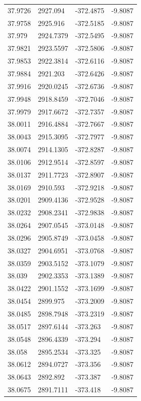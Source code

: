 \begin{table}[H]
\begin{tabular}{llll}
37.9726 & 2927.094 & -372.4875 & -9.8087 \\
37.9758 & 2925.916 & -372.5185 & -9.8087 \\
37.979 & 2924.7379 & -372.5495 & -9.8087 \\
37.9821 & 2923.5597 & -372.5806 & -9.8087 \\
37.9853 & 2922.3814 & -372.6116 & -9.8087 \\
37.9884 & 2921.203 & -372.6426 & -9.8087 \\
37.9916 & 2920.0245 & -372.6736 & -9.8087 \\
37.9948 & 2918.8459 & -372.7046 & -9.8087 \\
37.9979 & 2917.6672 & -372.7357 & -9.8087 \\
38.0011 & 2916.4884 & -372.7667 & -9.8087 \\
38.0043 & 2915.3095 & -372.7977 & -9.8087 \\
38.0074 & 2914.1305 & -372.8287 & -9.8087 \\
38.0106 & 2912.9514 & -372.8597 & -9.8087 \\
38.0137 & 2911.7723 & -372.8907 & -9.8087 \\
38.0169 & 2910.593 & -372.9218 & -9.8087 \\
38.0201 & 2909.4136 & -372.9528 & -9.8087 \\
38.0232 & 2908.2341 & -372.9838 & -9.8087 \\
38.0264 & 2907.0545 & -373.0148 & -9.8087 \\
38.0296 & 2905.8749 & -373.0458 & -9.8087 \\
38.0327 & 2904.6951 & -373.0768 & -9.8087 \\
38.0359 & 2903.5152 & -373.1079 & -9.8087 \\
38.039 & 2902.3353 & -373.1389 & -9.8087 \\
38.0422 & 2901.1552 & -373.1699 & -9.8087 \\
38.0454 & 2899.975 & -373.2009 & -9.8087 \\
38.0485 & 2898.7948 & -373.2319 & -9.8087 \\
38.0517 & 2897.6144 & -373.263 & -9.8087 \\
38.0548 & 2896.4339 & -373.294 & -9.8087 \\
38.058 & 2895.2534 & -373.325 & -9.8087 \\
38.0612 & 2894.0727 & -373.356 & -9.8087 \\
38.0643 & 2892.892 & -373.387 & -9.8087 \\
38.0675 & 2891.7111 & -373.418 & -9.8087 \\

\end{tabular}
\end{table}
